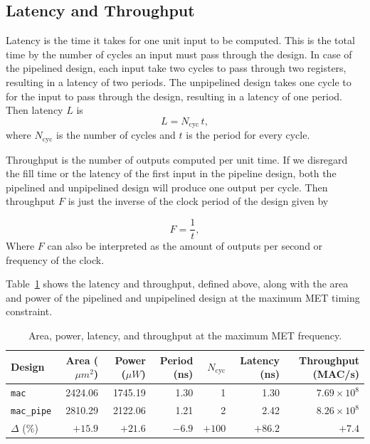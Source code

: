 \documentclass[a4paper,11pt]{article}
\begin{document}
\subsection{Latency and Throughput}

Latency is the time it takes for one unit input to be computed. This is the total time by the number of cycles an input must pass through the design. In case of the pipelined design, each input take two cycles to pass through two registers, resulting in a latency of two periods. The unpipelined design takes one cycle to for the input to pass through the design, resulting in a latency of one period. Then latency $L$ is
\[
L = N_\mathrm{cyc}\,t,
\]
where $N_\mathrm{cyc}$ is the number of cycles and $t$ is the period for every cycle.

Throughput is the number of outputs computed per unit time. If we disregard the fill time or the latency of the first input in the pipeline design, both the pipelined and unpipelined design will produce one output per cycle. Then throughput $F$ is just the inverse of the clock period of the design given by

\[
F = \frac{1}{t},
\]
Where $F$ can also be interpreted as the amount of outputs per second or frequency of the clock. 

Table~\ref{tab:lat-tp} shows the latency and throughput, defined above, along with the area and power of the pipelined and unpipelined design at the maximum MET timing constraint. 

\begin{table}[!htbp]
    \centering
    \scriptsize
    \begin{tabular}{lrrrrrr}
        \toprule
        \textbf{Design} &
        \textbf{Area ($\mu m^2$)} &
        \textbf{Power ($\mu W$)} &
        \textbf{Period (ns)} &
        \textbf{$N_\mathrm{cyc}$} &
        \textbf{Latency (ns)} &
        \textbf{Throughput (MAC/s)} \\
        \midrule
        \texttt{mac}       & 2424.06 & 1745.19 & 1.30 & 1 & 1.30 & $7.69\times 10^{8}$ \\
        \texttt{mac\_pipe} & 2810.29 & 2122.06 & 1.21 & 2 & 2.42 & $8.26\times 10^{8}$ \\
        \midrule
        $\Delta$ (\%)      & $+15.9$ & $+21.6$ & $-6.9$ & $+100$ & $+86.2$ & $+7.4$ \\
        \bottomrule
    \end{tabular}
    \caption{Area, power, latency, and throughput at the maximum MET frequency.}
    \label{tab:lat-tp}
\end{table}
\end{document}
